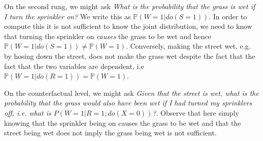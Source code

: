 \documentclass[../main.tex]{subfiles}
\begin{document}
   On the second rung, we might ask \emph{What is the probability that the grass is wet if I turn the sprinkler on?} We write this as ${\mathbb{P}(W=1|do(S=1))}$. In order to compute this it is not sufficient to know the joint distribution, we need to know that turning the sprinkler on \emph{causes} the grass to be wet and hence ${\mathbb{P}(W=1|do(S=1))\neq \mathbb{P}(W=1)}$.  Conversely, making the street wet, e.g. by hosing down the street, does not make the grass wet despite the fact that the fact that the two variables are dependent, i.e ${\mathbb{P}(W=1|do(R=1))=\mathbb{P}(W=1)}$.
   
   On the counterfactual level, we might ask \emph{Given that the street is wet, what is the probability that the grass would also have been wet if I had turned my sprinklers off, i.e. what is ${P(W=1|R=1;do(X=0))}$?}. Observe that here simply knowing that the sprinkler being on causes the grass to be wet and that the street being wet does not imply the grass being wet is not sufficient. 
\end{document}
